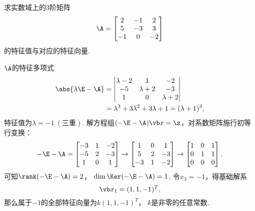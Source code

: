 \begin{example}
求实数域上的3阶矩阵\[
	\A = \begin{bmatrix}
		2 & -1 & 2 \\
		5 & -3 & 3 \\
		-1 & 0 & -2
	\end{bmatrix}
\]的特征值与对应的特征向量.
\begin{solution}
\(\A\)的特征多项式\begin{align*}
	\abs{\lambda\E-\A}
	&= \begin{vmatrix}
		\lambda-2 & 1 & -2 \\
		-5 & \lambda+2 & -3 \\
		1 & 0 & \lambda+2
	\end{vmatrix} \\
	&= \lambda^3 + 3\lambda^2 + 3\lambda + 1
	= (\lambda+1)^3,
\end{align*}
特征值为\(\lambda=-1\ (\text{三重})\).
解方程组\((-\E-\A)\x = \z\)，对系数矩阵施行初等行变换：\[
	-\E-\A = \begin{bmatrix}
		-3 & 1 & -2 \\
		-5 & 2 & -3 \\
		1 & 0 & 1
	\end{bmatrix} \to \begin{bmatrix}
		1 & 0 & 1 \\
		5 & 2 & -3 \\
		-3 & 1 & -2
	\end{bmatrix} \to \begin{bmatrix}
		1 & 0 & 1 \\
		0 & 1 & 1 \\
		0 & 0 & 0
	\end{bmatrix}.
\]
可知\(\rank(-\E-\A) = 2\)，
\(\dim\Ker(-\E-\A) = 1\).
令\(x_3 = -1\)，得基础解系\[
	\x_1 = (1,1,-1)^T,
\]
那么属于\(-1\)的全部特征向量为\(k (1,1,-1)^T\)，
\(k\)是非零的任意常数.
\end{solution}
\end{example}

